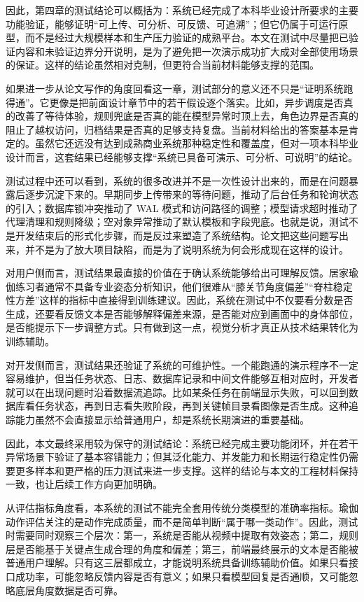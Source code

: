 因此，第四章的测试结论可以概括为：系统已经完成了本科毕业设计所要求的主要功能验证，能够证明“可上传、可分析、可反馈、可追溯”；但它仍属于可运行原型，而不是经过大规模样本和生产压力验证的成熟平台。本文在测试中尽量把已验证内容和未验证边界分开说明，是为了避免把一次演示成功扩大成对全部使用场景的保证。这样的结论虽然相对克制，但更符合当前材料能够支撑的范围。

如果进一步从论文写作的角度回看这一章，测试部分的意义还不只是“证明系统跑得通”。它更像是把前面设计章节中的若干假设逐个落实。比如，异步调度是否真的改善了等待体验，规则兜底是否真的能在模型异常时顶上去，角色边界是否真的阻止了越权访问，归档结果是否真的足够支持复盘。当前材料给出的答案基本是肯定的。虽然它还远没有达到成熟商业系统那种稳定性和覆盖度，但对一项本科毕业设计而言，这套结果已经能够支撑“系统已具备可演示、可分析、可说明”的结论。

测试过程中还可以看到，系统的很多改进并不是一次性设计出来的，而是在问题暴露后逐步沉淀下来的。早期同步上传带来的等待问题，推动了后台任务和轮询状态的引入；数据库锁冲突推动了 WAL 模式和访问路径的调整；模型请求超时推动了代理清理和规则降级；空对象异常推动了默认模板和字段兜底。也就是说，测试不是开发结束后的形式化步骤，而是反过来塑造了系统结构。论文把这些问题写出来，并不是为了放大项目缺陷，而是为了说明系统为何会形成现在这样的设计。

对用户侧而言，测试结果最直接的价值在于确认系统能够给出可理解反馈。居家瑜伽练习者通常不具备专业姿态分析知识，他们很难从“膝关节角度偏差”“脊柱稳定性方差”这样的指标中直接得到训练建议。因此，系统在测试中不仅要看分数是否生成，还要看反馈文本是否能够解释偏差来源，是否能对应到画面中的身体部位，是否能提示下一步调整方式。只有做到这一点，视觉分析才真正从技术结果转化为训练辅助。

对开发侧而言，测试结果还验证了系统的可维护性。一个能跑通的演示程序不一定容易维护，但当任务状态、日志、数据库记录和中间文件能够互相对应时，开发者就可以在出现问题时沿着数据流追踪。比如某条任务在前端显示失败，可以回到数据库看任务状态，再到日志看失败阶段，再到关键帧目录看图像是否生成。这种追踪能力虽然不会直接显示给普通用户，却是系统长期演进的重要基础。

因此，本文最终采用较为保守的测试结论：系统已经完成主要功能闭环，并在若干异常场景下验证了基本容错能力；但其泛化能力、并发能力和长期运行稳定性仍需要更多样本和更严格的压力测试来进一步支撑。这样的结论与本文的工程材料保持一致，也让后续工作方向更加明确。

从评估指标角度看，本系统的测试不能完全套用传统分类模型的准确率指标。瑜伽动作评估关注的是动作完成质量，而不是简单判断“属于哪一类动作”。因此，测试时需要同时观察三个层次：第一，系统是否能从视频中提取有效姿态；第二，规则层是否能基于关键点生成合理的角度和偏差；第三，前端最终展示的文本是否能被普通用户理解。只有这三层都成立，才能说明系统具备训练辅助价值。如果只看接口成功率，可能忽略反馈内容是否有意义；如果只看模型回复是否通顺，又可能忽略底层角度数据是否可靠。

